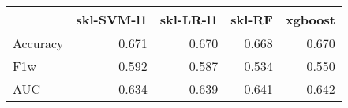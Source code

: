 \begin{tabular}{lrrrr}
\toprule
{} &  skl-SVM-l1 &  skl-LR-l1 &  skl-RF &  xgboost \\
\midrule
Accuracy &       0.671 &      0.670 &   0.668 &    0.670 \\
F1w      &       0.592 &      0.587 &   0.534 &    0.550 \\
AUC      &       0.634 &      0.639 &   0.641 &    0.642 \\
\bottomrule
\end{tabular}

